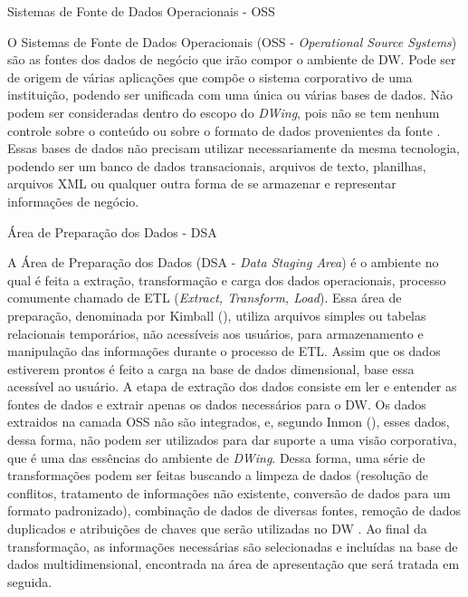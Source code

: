 \begin{description}
	\item[Sistemas de Fonte de Dados Operacionais - OSS]
\end{description}
%

O Sistemas de Fonte de Dados Operacionais (OSS - \emph{Operational Source Systems}) são as fontes dos dados de negócio que irão compor o ambiente de DW.
%
Pode ser de origem de várias aplicações que compõe o sistema corporativo de uma instituição, podendo ser unificada com uma única ou várias bases de dados.
%
Não podem ser consideradas dentro do escopo do \emph{DWing}, pois  não se tem nenhum controle sobre o conteúdo ou sobre o formato de dados provenientes da fonte \cite{kimball2002}.
%
Essas bases de dados não precisam utilizar necessariamente da mesma tecnologia, podendo ser um banco de dados transacionais, arquivos de texto, planilhas, arquivos XML ou qualquer outra forma de se armazenar e representar informações de negócio.

\begin{description}
\item[Área de Preparação dos Dados - DSA]
\end{description}
%

A Área de Preparação dos Dados (DSA - \emph{Data Staging Area}) é o ambiente no qual é feita a extração, transformação e carga dos dados operacionais, processo comumente chamado de ETL (\emph{Extract, Transform, Load}).
%
Essa área de preparação, denominada por Kimball (\citeyear{kimball2002}), utiliza arquivos simples ou tabelas relacionais temporários, não acessíveis aos usuários, para armazenamento e manipulação das informações durante o processo de ETL.
%
Assim que os dados estiverem prontos é feito a carga na base de dados dimensional, base essa acessível ao usuário.
%
A etapa de extração dos dados consiste em ler e entender as fontes de dados e extrair apenas os dados necessários para o DW.
%
Os dados extraidos na camada OSS não são integrados, e, segundo Inmon (\citeyear{inmon2002}), esses dados, dessa forma, não podem ser utilizados para dar suporte a uma visão corporativa, que é uma das essências do ambiente de \emph{DWing}.
%
Dessa forma, uma série de transformações podem ser feitas buscando a limpeza de dados (resolução de conflitos, tratamento de informações não existente, conversão de dados para um formato padronizado), combinação de dados de diversas fontes, remoção de dados duplicados e atribuições de chaves que serão utilizadas no DW \cite{kimball2002}.
%
Ao final da transformação, as informações necessárias são selecionadas e incluídas na base de dados multidimensional, encontrada na área de apresentação que será tratada em seguida.


